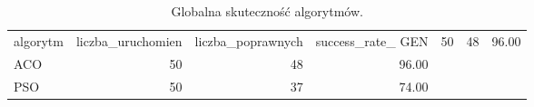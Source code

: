 \begin{table}
\caption{Globalna skuteczność algorytmów.}
\label{tab:success_rate}
\begin{tabular}{lrrr}
\toprule
algorytm & liczba_uruchomien & liczba_poprawnych & success_rate_%
\midrule
GEN & 50 & 48 & 96.00 \\
ACO & 50 & 48 & 96.00 \\
PSO & 50 & 37 & 74.00 \\
\bottomrule
\end{tabular}
\end{table}
